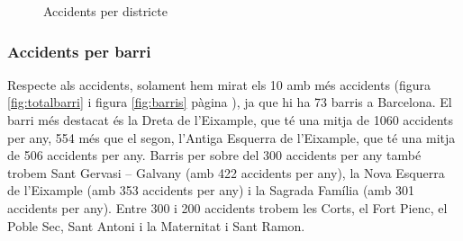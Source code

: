 \begin{figure}[H]
\footnotesize
\centering
{}%
\caption{Accidents per districte}
\label{fig:totaldistricte}
\end{figure}
\subsubsection*{Accidents per barri}
Respecte als accidents, solament hem mirat els 10 amb més accidents (figura \ref{fig:totalbarri} i figura \ref{fig:barris} pàgina \pageref{fig:barris}), ja que hi ha 73 barris a Barcelona. El barri més destacat és la Dreta de l'Eixample, que té una mitja de 1060 accidents per any, 554 més que el segon, l'Antiga Esquerra de l'Eixample, que té una mitja de 506 accidents per any. Barris per sobre del 300 accidents per any també trobem Sant Gervasi – Galvany (amb 422 accidents per any), la Nova Esquerra de l'Eixample (amb 353 accidents per any) i la Sagrada Família (amb 301 accidents per any). Entre 300 i 200 accidents trobem les Corts, el Fort Pienc, el Poble Sec, Sant Antoni i la Maternitat i Sant Ramon. 

